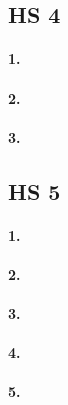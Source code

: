 \documentclass[
]{article}
\begin{document}
\hypertarget{hs-4}{%
\subsection{HS 4}\label{hs-4}}

\hypertarget{section-15}{%
\paragraph{\texorpdfstring{\textbf{1.}}{1.}}\label{section-15}}

\hypertarget{section-16}{%
\paragraph{\texorpdfstring{\textbf{2.}}{2.}}\label{section-16}}

\hypertarget{section-17}{%
\paragraph{\texorpdfstring{\textbf{3.}}{3.}}\label{section-17}}

\hypertarget{hs-5}{%
\subsection{HS 5}\label{hs-5}}

\hypertarget{section-18}{%
\paragraph{\texorpdfstring{\textbf{1.}}{1.}}\label{section-18}}

\hypertarget{section-19}{%
\paragraph{\texorpdfstring{\textbf{2.}}{2.}}\label{section-19}}

\hypertarget{section-20}{%
\paragraph{\texorpdfstring{\textbf{3.}}{3.}}\label{section-20}}

\hypertarget{section-21}{%
\paragraph{\texorpdfstring{\textbf{4.}}{4.}}\label{section-21}}

\hypertarget{section-22}{%
\paragraph{\texorpdfstring{\textbf{5.}}{5.}}\label{section-22}}
\end{document}
